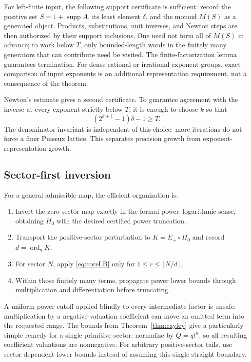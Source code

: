 \documentclass[11pt,a4paper]{article}
\theoremstyle{definition}
\theoremstyle{remark}
\newcommand{\supp}{\operatorname{supp}}
\newcommand{\ordq}{\operatorname{ord}_q}
\begin{document}
For left-finite input, the following support certificate is sufficient:
record the positive set $S=1+\supp A$, its least element $\delta$, and the
monoid $M(S)$ as a generated object. Products, substitutions, unit inverses,
and Newton steps are then authorized by their support inclusions. One need
not form all of $M(S)$ in advance; to work below $T$, only bounded-length
words in the finitely many generators that can contribute need be visited.
The finite-factorization lemma guarantees termination. For dense rational
or irrational exponent groups, exact comparison of input exponents is an
additional representation requirement, not a consequence of the theorem.

Newton's estimate gives a second certificate. To guarantee agreement with
the inverse at every exponent strictly below $T$, it is enough to choose
$k$ so that
\[
 (2^{k+1}-1)\delta-1\ge T.
\]
The denominator invariant is independent of this choice: more iterations
do not force a finer Puiseux lattice. This separates precision growth from
exponent-representation growth.

\subsection{Sector-first inversion}
For a general admissible map, the efficient organization is:
\begin{enumerate}[label=\arabic*.]
 \item Invert the zero-sector map exactly in the formal power--logarithmic
       sense, obtaining $H_0$ with the desired certified power truncation.
 \item Transport the positive-sector perturbation to
       $K=E_+\circ H_0$ and record $d=\ordq K$.
 \item For sector $N$, apply \eqref{eq:coreLB} only for
       $1\le r\le\lfloor N/d\rfloor$.
 \item Within those finitely many terms, propagate power lower bounds
       through multiplication and differentiation before truncating.
\end{enumerate}
A uniform power cutoff applied blindly to every intermediate factor is
unsafe: multiplication by a negative-valuation coefficient can move an
omitted term into the requested range. The bounds from
Theorem~\ref{thm:cayley} give a particularly simple remedy for a single
primitive sector: normalize by $Q=qt^\kappa$, so all resulting coefficient
valuations are nonnegative. For arbitrary positive-sector tails, use
sector-dependent lower bounds instead of assuming this single straight
boundary.
\end{document}
